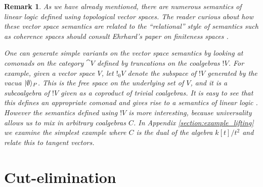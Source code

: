 \documentclass[english,letter paper,12pt,reqno]{article}
\DeclarePairedDelimiter\ket{\lvert}{\rangle}
\theoremstyle{example}
\newtheorem{remark}[theorem]{Remark}
\def\vacu{\ket{\emptyset}}
\begin{document}
\begin{remark}\label{remark_otherpromotion} As we have already mentioned, there are numerous semantics of linear logic defined using topological vector spaces. The reader curious about how these vector space semantics are related to the ``relational'' style of semantics such as coherence spaces should consult Ehrhard's paper on finiteness spaces \cite{ehrhard}.

One can generate simple variants on the vector space semantics by looking at comonads on the category $\cat{V}$ defined by truncations on the coalgebras ${!} V$. For example, given a vector space $V$, let ${!}_0 V$ denote the subspace of ${!} V$ generated by the vacua $\vacu_P$. This is the free space on the underlying \emph{set} of $V$, and it is a subcoalgebra of ${!} V$ given as a coproduct of trivial coalgebras. It is easy to see that this defines an appropriate comonad and gives rise to a semantics of linear logic \cite[\S 4.3]{valiron}. However the semantics defined using ${!} V$ is more interesting, because universality allows us to mix in arbitrary coalgebras $C$. In Appendix \ref{section:example_lifting} we examine the simplest example where $C$ is the dual of the algebra $k[t]/t^2$ and relate this to tangent vectors.
\end{remark}

\section{Cut-elimination}\label{section:cut_elim}
\end{document}
